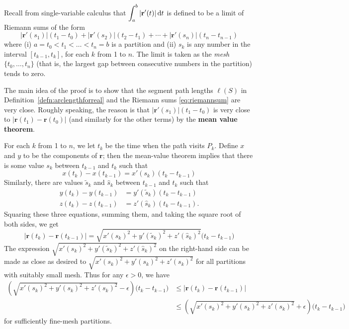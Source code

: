 \documentclass{watsonbook}
\begin{document}
  \begin{pf}[title=Proof (idea)]
    Recall from single-variable calculus that
    $\displaystyle{\int_a^b |\mathbf{r}'(t)| \, \mathrm{d}t}$ is defined to be a limit of
    Riemann sums of the form
    \begin{equation} \label{eq:riemannsum}
      |\mathbf{r}'(s_1)|(t_1-t_0) + |\mathbf{r}'(s_2)|(t_2-t_1) + \cdots + |\mathbf{r}'(s_n)|(t_n-t_{n-1})
    \end{equation}
    where (i) $a = t_0 < t_1 < \ldots < t_n = b$ is a partition and
    (ii) $s_k$ is any number in the interval $[t_{k-1},t_k]$, for each
    $k$ from 1 to $n$. The limit is taken as the \textit{mesh}
    $\{t_0, \ldots, t_n\}$ (that is, the largest gap between
    consecutive numbers in the partition) tends to zero. 

    The main idea of the proof is to show that the segment path
    lengths $\ell(S)$ in Definition~\ref{defn:arclengthforreal} and
    the Riemann sums \eqref{eq:riemannsum} are very close. Roughly
    speaking, the reason is that $|\mathbf{r}'(s_1)|(t_1-t_0)$ is very
    close to $|\mathbf{r}(t_1) - \mathbf{r}(t_0)|$ (and similarly for
    the other terms) by the \textbf{mean value theorem}.

    For each $k$ from 1 to $n$, we let $t_k$ be the time when the path
    visits $P_k$. Define $x$ and $y$ to be the components of
    $\mathbf{r}$; then the mean-value theorem implies that there is
    some value $s_k$ between $t_{k-1}$ and $t_k$ such that 
    \[
      x(t_k) - x(t_{k-1}) = x'(s_k)(t_{k}-t_{k-1})
    \]
    Similarly, there are values $\tilde{s}_k$ and $\hat{s}_k$ between $t_{k-1}$ and
    $t_k$ such that
    \begin{align*}
      y(t_k) - y(t_{k-1}) &= y'(\tilde{s}_k)(t_{k}-t_{k-1})\\
      z(t_k) - z(t_{k-1}) &= z'(\hat{s}_k)(t_{k}-t_{k-1}). 
    \end{align*}
    Squaring these three equations, summing them, and taking the
    square root of both sides, we get
    \[
      |\mathbf{r}(t_k) - \mathbf{r}(t_{k-1})| = \sqrt{x'(s_k)^2 +
        y'(\tilde{s}_k)^2 + z'(\hat{s}_k)^2}\bigg(t_k-t_{k-1}\bigg)
    \]
    The expression
    $\sqrt{x'(s_k)^2 + y'(\tilde{s}_k)^2 + z'(\hat{s}_k)^2}$ on the
    right-hand side can be made as close as desired to
    $\sqrt{x'(s_k)^2 + y'({s}_k)^2 + z'({s}_k)^2}$ for all partitions
    with suitably small mesh. Thus for any $\epsilon > 0$, we have
    \begin{align} \label{eq:ineq}
       \left(\sqrt{x'(s_k)^2 +
         y'({s}_k)^2 + z'({s}_k)^2} - \epsilon\right)
      \bigg(t_k-t_{k-1}\bigg)  
      &\leq
        |\mathbf{r}(t_k) - \mathbf{r}(t_{k-1})| \\ \nonumber
      &\leq \left(\sqrt{x'(s_k)^2 +
         y'({s}_k)^2 + z'({s}_k)^2} + \epsilon\right) \bigg(t_k-t_{k-1}\bigg)
    \end{align}
    for sufficiently fine-mesh partitions. 
    

\end{pf}
\end{document}
